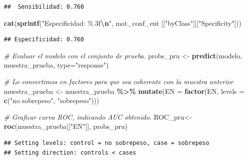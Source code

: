 \documentclass[
]{article}
\newenvironment{Shaded}{\begin{snugshade}}{\end{snugshade}}
\newcommand{\AttributeTok}[1]{\textcolor[rgb]{0.13,0.29,0.53}{#1}}
\newcommand{\CommentTok}[1]{\textcolor[rgb]{0.56,0.35,0.01}{\textit{#1}}}
\newcommand{\FunctionTok}[1]{\textcolor[rgb]{0.13,0.29,0.53}{\textbf{#1}}}
\newcommand{\NormalTok}[1]{#1}
\newcommand{\OtherTok}[1]{\textcolor[rgb]{0.56,0.35,0.01}{#1}}
\newcommand{\SpecialCharTok}[1]{\textcolor[rgb]{0.81,0.36,0.00}{\textbf{#1}}}
\newcommand{\StringTok}[1]{\textcolor[rgb]{0.31,0.60,0.02}{#1}}
\begin{document}
\begin{verbatim}
##  Sensibilidad: 0.760
\end{verbatim}

\begin{Shaded}
\begin{Highlighting}[]
\FunctionTok{cat}\NormalTok{(}\FunctionTok{sprintf}\NormalTok{(}\StringTok{"Especificidad: \%.3f}\SpecialCharTok{\textbackslash{}n}\StringTok{"}\NormalTok{, mat\_conf\_ent [[}\StringTok{"byClass"}\NormalTok{]][}\StringTok{"Specificity"}\NormalTok{]))}
\end{Highlighting}
\end{Shaded}

\begin{verbatim}
## Especificidad: 0.760
\end{verbatim}

\begin{Shaded}
\begin{Highlighting}[]
\CommentTok{\# Evaluar el modelo con el conjunto de prueba.}
\NormalTok{probs\_pru }\OtherTok{\textless{}{-}} \FunctionTok{predict}\NormalTok{(modelo, muestra\_prueba, }\AttributeTok{type=}\StringTok{"response"}\NormalTok{)}

\CommentTok{\# Lo convertimos en factores para que sea coherente con la muestra anterior}
\NormalTok{muestra\_prueba }\OtherTok{\textless{}{-}}\NormalTok{ muestra\_prueba }\SpecialCharTok{\%\textgreater{}\%}
    \FunctionTok{mutate}\NormalTok{(}\AttributeTok{EN =} \FunctionTok{factor}\NormalTok{(EN, }\AttributeTok{levels =} \FunctionTok{c}\NormalTok{(}\StringTok{"no sobrepeso"}\NormalTok{, }\StringTok{"sobrepeso"}\NormalTok{)))}

\CommentTok{\# Graficar curva ROC, indicando AUC obtenido.}
\NormalTok{ROC\_pru}\OtherTok{\textless{}{-}} \FunctionTok{roc}\NormalTok{(muestra\_prueba[[}\StringTok{"EN"}\NormalTok{]], probs\_pru)}
\end{Highlighting}
\end{Shaded}

\begin{verbatim}
## Setting levels: control = no sobrepeso, case = sobrepeso
## Setting direction: controls < cases
\end{verbatim}
\end{document}
